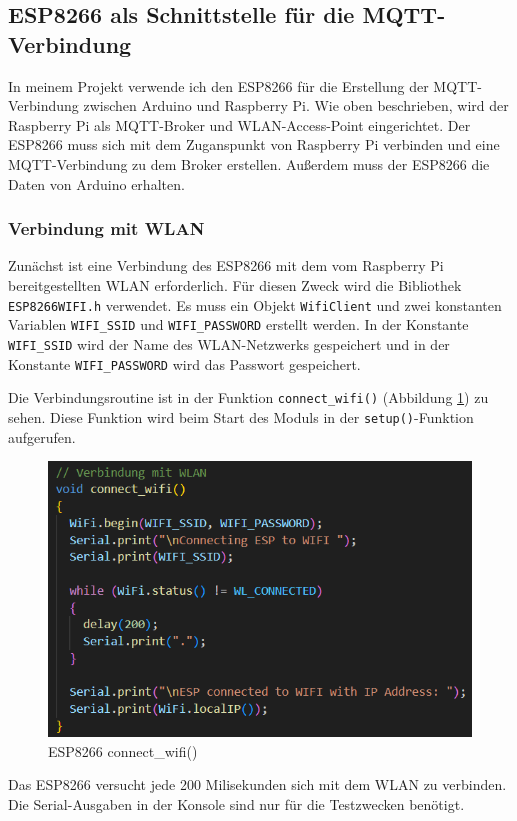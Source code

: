 \documentclass[12pt, letterpaper]{article}
\begin{document}
\subsection[ESP8266-Raspberry Pi]{ESP8266 als Schnittstelle für die MQTT-Verbindung}
\par In meinem Projekt verwende ich den ESP8266 für die Erstellung der MQTT-Verbindung zwischen Arduino und Raspberry Pi. Wie oben beschrieben, wird der Raspberry Pi als MQTT-Broker und WLAN-Access-Point eingerichtet. Der ESP8266 muss sich mit dem Zuganspunkt von Raspberry Pi verbinden und eine MQTT-Verbindung zu dem Broker erstellen. Außerdem muss der ESP8266 die Daten von Arduino erhalten.
\subsubsection{Verbindung mit WLAN}
\par Zunächst ist eine Verbindung des ESP8266 mit dem vom Raspberry Pi bereitgestellten WLAN erforderlich. Für diesen Zweck wird die Bibliothek \texttt{ESP8266WIFI.h} verwendet. Es muss ein Objekt \texttt{WifiClient} und zwei konstanten Variablen \texttt{WIFI\_SSID} und \texttt{WIFI\_PASSWORD} erstellt werden. In der Konstante \texttt{WIFI\_SSID} wird der Name des WLAN-Netzwerks gespeichert und in der Konstante \texttt{WIFI\_PASSWORD} wird das Passwort gespeichert.
\par Die Verbindungsroutine ist in der Funktion \texttt{connect\_wifi()} (Abbildung \ref{abb:espwifi}) zu sehen. Diese Funktion wird beim Start des Moduls in der \texttt{setup()}-Funktion aufgerufen.
\begin{figure}[h]
  \centering
  \includegraphics[scale = 1]{connect_wifi.png}
  \caption{ESP8266 connect\_wifi()}
  \label{abb:espwifi}
\end{figure}
\par Das ESP8266 versucht jede 200 Milisekunden sich mit dem WLAN zu verbinden. Die Serial-Ausgaben in der Konsole sind nur für die Testzwecken benötigt. 
\end{document}
